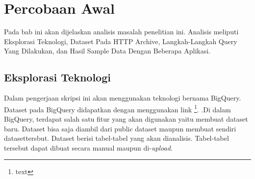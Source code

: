 \chapter{Percobaan Awal}
\label{chap:percobaan_awal}
Pada bab ini akan dijelaskan analisis masalah penelitian ini. Analisis meliputi Eksplorasi Teknologi, Dataset Pada HTTP Archive, Langkah-Langkah Query Yang Dilakukan, dan Hasil Sample Data Dengan Beberapa Aplikasi.

\section{Eksplorasi Teknologi}
Dalam pengerjaan skripsi ini akan menggunakan teknologi bernama BigQuery. Dataset pada BigQuery didapatkan dengan menggunakan link \footnote{text}. .Di dalam BigQuery, terdapat salah satu fitur yang akan digunakan yaitu membuat dataset baru. Dataset bisa saja diambil dari public dataset maupun membuat sendiri datasettersbut. Dataset berisi tabel-tabel yang akan dianalisis. Tabel-tabel tersebut dapat dibuat secara manual maupun di-\textit{upload}.

